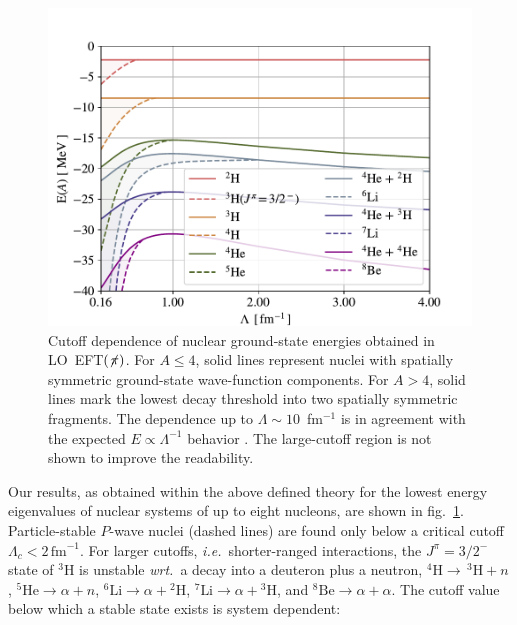 \documentclass[onecolumn,preprint,superscriptaddress,nofootinbib]{revtex4-1}
\newcommand{\lc}{\ensuremath{\Lambda_c}}
\newcommand{\fm}{\ensuremath{\,\text{fm}^{-1}}}
\newcommand{\wrt}{\textit{wrt.}~}
\newcommand{\ie}{\textit{i.e.}~}
\newcommand{\eftnopi}{\mbox{EFT$(\not \! \pi)$}}
\newcommand{\figref}[1]{fig.~\ref{#1}}
\begin{document}
\begin{figure}
\centering
\includegraphics[width=\linewidth]{./Nuclear.pdf} 
\caption{Cutoff dependence of nuclear ground-state energies
obtained in LO~\eftnopi. For $A \leq 4$, solid lines represent nuclei with
spatially symmetric ground-state wave-function components. For $A>4$,
solid lines mark the lowest decay threshold into two spatially symmetric fragments.
The dependence up to $\Lambda\sim 10$~fm$^{-1}$ is in agreement with the expected $E\propto\Lambda^{-1}$ behavior \cite{Bedaque:1998kg, Barnea:2013uqa}.
The large-cutoff region is not shown to improve the readability.}
\label{fig:nuclear}
\end{figure}

Our results, as obtained within the above defined theory
for the lowest energy eigenvalues of nuclear systems of up to eight nucleons, are shown
in \figref{fig:nuclear}.
Particle-stable $P$-wave nuclei (dashed lines) are found only below a critical cutoff $\lc<2\fm$.
For larger cutoffs, \ie shorter-ranged interactions,
the $J^\pi=3/2^-$ state of $^3$H is unstable \wrt a decay into a deuteron plus a neutron, \mbox{$^4\text{H}\to\,^3\text{H} + n$},
\mbox{$^5\text{He}\to\alpha +n$}, \mbox{$^6\text{Li}\to\alpha+{}^2\text{H}$}, \mbox{$^7\text{Li}\to\alpha + {}^3\text{H}$},
 and \mbox{$^8\text{Be}\to \alpha+\alpha$}.
The cutoff value below which a stable state exists is system dependent:
\end{document}

